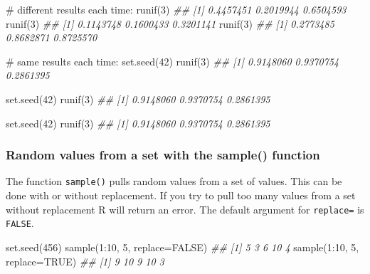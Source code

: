 \documentclass[
  13,
  letterpaper,
]{report}
\newenvironment{Shaded}{\begin{snugshade}}{\end{snugshade}}
\newcommand{\AttributeTok}[1]{\textcolor[rgb]{0.40,0.45,0.13}{#1}}
\newcommand{\CommentTok}[1]{\textcolor[rgb]{0.37,0.37,0.37}{#1}}
\newcommand{\ConstantTok}[1]{\textcolor[rgb]{0.56,0.35,0.01}{#1}}
\newcommand{\DecValTok}[1]{\textcolor[rgb]{0.68,0.00,0.00}{#1}}
\newcommand{\DocumentationTok}[1]{\textcolor[rgb]{0.37,0.37,0.37}{\textit{#1}}}
\newcommand{\FunctionTok}[1]{\textcolor[rgb]{0.28,0.35,0.67}{#1}}
\newcommand{\NormalTok}[1]{\textcolor[rgb]{0.00,0.23,0.31}{#1}}
\newcommand{\SpecialCharTok}[1]{\textcolor[rgb]{0.37,0.37,0.37}{#1}}
\begin{document}
\begin{Shaded}
\begin{Highlighting}[]

\CommentTok{\# different results each time:}
\FunctionTok{runif}\NormalTok{(}\DecValTok{3}\NormalTok{)}
\DocumentationTok{\#\# [1] 0.4457451 0.2019944 0.6504593}
\FunctionTok{runif}\NormalTok{(}\DecValTok{3}\NormalTok{)}
\DocumentationTok{\#\# [1] 0.1143748 0.1600433 0.3201141}
\FunctionTok{runif}\NormalTok{(}\DecValTok{3}\NormalTok{)}
\DocumentationTok{\#\# [1] 0.2773485 0.8682871 0.8725570}

\CommentTok{\# same results each time:}
\FunctionTok{set.seed}\NormalTok{(}\DecValTok{42}\NormalTok{)}
\FunctionTok{runif}\NormalTok{(}\DecValTok{3}\NormalTok{)}
\DocumentationTok{\#\# [1] 0.9148060 0.9370754 0.2861395}

\FunctionTok{set.seed}\NormalTok{(}\DecValTok{42}\NormalTok{)}
\FunctionTok{runif}\NormalTok{(}\DecValTok{3}\NormalTok{)}
\DocumentationTok{\#\# [1] 0.9148060 0.9370754 0.2861395}

\FunctionTok{set.seed}\NormalTok{(}\DecValTok{42}\NormalTok{)}
\FunctionTok{runif}\NormalTok{(}\DecValTok{3}\NormalTok{)}
\DocumentationTok{\#\# [1] 0.9148060 0.9370754 0.2861395}
\end{Highlighting}
\end{Shaded}

\subsubsection{Random values from a set with the sample()
function}\label{sec-05-make-rand-samp}

The function \texttt{sample()} pulls random values from a set of values.
This can be done with or without replacement. If you try to pull too
many values from a set without replacement R will return an error. The
default argument for \texttt{replace=} is \texttt{FALSE}.

\begin{Shaded}
\begin{Highlighting}[]
\FunctionTok{set.seed}\NormalTok{(}\DecValTok{456}\NormalTok{)}
\FunctionTok{sample}\NormalTok{(}\DecValTok{1}\SpecialCharTok{:}\DecValTok{10}\NormalTok{, }\DecValTok{5}\NormalTok{, }\AttributeTok{replace=}\ConstantTok{FALSE}\NormalTok{) }
\DocumentationTok{\#\# [1]  5  3  6 10  4}
\FunctionTok{sample}\NormalTok{(}\DecValTok{1}\SpecialCharTok{:}\DecValTok{10}\NormalTok{, }\DecValTok{5}\NormalTok{, }\AttributeTok{replace=}\ConstantTok{TRUE}\NormalTok{)}
\DocumentationTok{\#\# [1]  9 10  9 10  3}
\end{Highlighting}
\end{Shaded}
\end{document}
